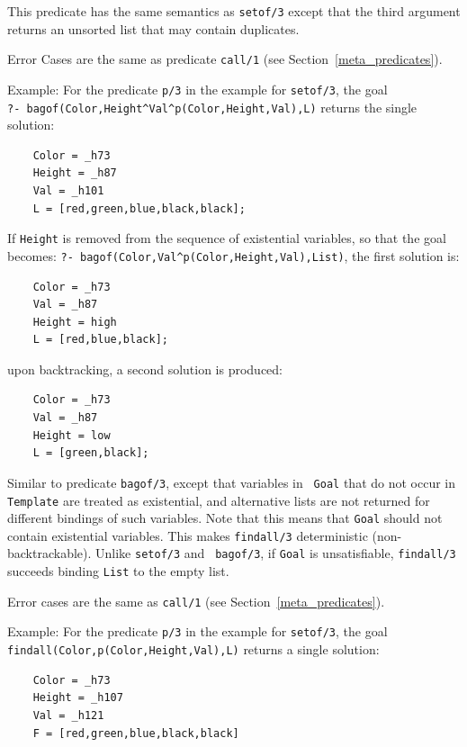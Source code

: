 \begin{description}
%
This predicate has the same semantics as {\tt setof/3} except that the
third argument returns an unsorted list that may contain duplicates.

Error Cases are the same as predicate {\tt call/1} (see
Section~\ref{meta_predicates}).

Example: 
%
For the predicate {\tt p/3} in the example for {\tt setof/3}, the
goal\\ 
\verb|?- bagof(Color,Height^Val^p(Color,Height,Val),L)| returns
the single solution:
\begin{verbatim}
    Color = _h73
    Height = _h87
    Val = _h101
    L = [red,green,blue,black,black];
\end{verbatim}
If {\tt Height} is removed from the sequence of existential variables, so
that the goal becomes: 
\verb|?- bagof(Color,Val^p(Color,Height,Val),List)|, the first solution is:
\begin{verbatim}
    Color = _h73
    Val = _h87
    Height = high
    L = [red,blue,black];
\end{verbatim}
%
upon backtracking, a second solution is produced: 
%
\begin{verbatim}
    Color = _h73
    Val = _h87
    Height = low
    L = [green,black];
\end{verbatim}


Similar to predicate {\tt bagof/3}, except that variables in {\tt
  Goal} that do not occur in {\tt Template} are treated as
existential, and alternative lists are not returned for different
bindings of such variables.  Note that this means that {\tt Goal}
should not contain existential variables.  This makes {\tt findall/3}
deterministic (non-backtrackable).  Unlike {\tt setof/3} and {\tt
  bagof/3}, if {\tt Goal} is unsatisfiable, {\tt findall/3} succeeds
binding {\tt List} to the empty list.

Error cases are the same as {\tt call/1} (see
Section~\ref{meta_predicates}).

Example: 
%
For the predicate {\tt p/3} in the example for {\tt setof/3}, the goal \\
{\tt findall(Color,p(Color,Height,Val),L)} returns a single solution: 
%
\begin{verbatim}
    Color = _h73
    Height = _h107
    Val = _h121
    F = [red,green,blue,black,black]
\end{verbatim}


\end{description}
